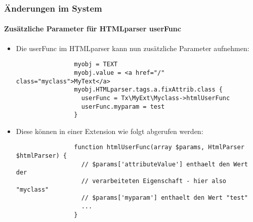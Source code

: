 \begin{frame}[fragile]
	\frametitle{Änderungen im System}
	\framesubtitle{Zusätzliche Parameter für HTMLparser userFunc}

	\lstset{basicstyle=\tiny\ttfamily}

	\begin{itemize}

		\item Die userFunc im HTMLparser kann nun zusätzliche Parameter aufnehmen:

			\begin{lstlisting}
				myobj = TEXT
				myobj.value = <a href="/" class="myclass">MyText</a>
				myobj.HTMLparser.tags.a.fixAttrib.class {
				  userFunc = Tx\MyExt\Myclass->htmlUserFunc
				  userFunc.myparam = test
				}
			\end{lstlisting}

		\item Diese können in einer Extension wie folgt abgerufen werden:

			\begin{lstlisting}
				function htmlUserFunc(array $params, HtmlParser $htmlParser) {
				  // $params['attributeValue'] enthaelt den Wert der
				  // verarbeiteten Eigenschaft - hier also "myclass"
				  // $params['myparam'] enthaelt den Wert "test"
				  ...
				}
			\end{lstlisting}

	\end{itemize}

\end{frame}

